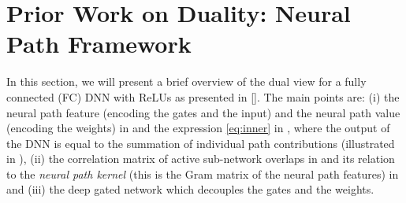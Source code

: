 \section{Prior Work on Duality: Neural Path Framework}\label{sec:dual}
In this section, we will present a brief overview of the dual view for a fully connected (FC) DNN with ReLUs as presented in []. The main points are: (i) the neural path feature (encoding the gates and the input) and the neural path value (encoding the weights) in  and the expression \eqref{eq:inner} in , where the output of the DNN is equal to the summation of individual path contributions (illustrated in ), (ii) the correlation matrix of active sub-network overlaps in  and its relation to the \emph{neural path kernel} (this is the Gram matrix of the neural path features) in  and (iii) the deep gated network which decouples the gates and the weights.

